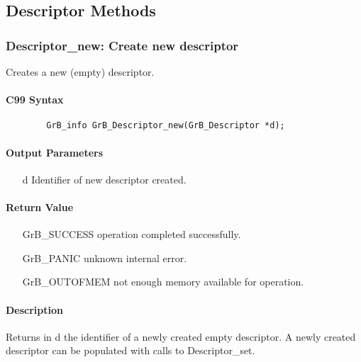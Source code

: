 \subsection{Descriptor Methods}

\subsubsection{{\sf Descriptor\_new}: Create new descriptor}

Creates a new (empty) descriptor.

\paragraph{C99 Syntax}

\begin{verbatim}
        GrB_info GrB_Descriptor_new(GrB_Descriptor *d);
\end{verbatim}

\paragraph{Output Parameters}

\begin{itemize}[leftmargin=1.1in]
    \item[{\sf d}] Identifier of new descriptor created.
\end{itemize}

\paragraph{Return Value}

\begin{itemize}[leftmargin=2.1in]
\item[{\sf GrB\_SUCCESS}]           operation completed successfully.
\item[{\sf GrB\_PANIC}]             unknown internal error.
\item[{\sf GrB\_OUTOFMEM}]          not enough memory available for operation.
\end{itemize}

\paragraph{Description}

Returns in {\sf d} the identifier of a newly created empty descriptor.
A newly created descriptor can be populated with calls to {\sf
Descriptor\_set}.

